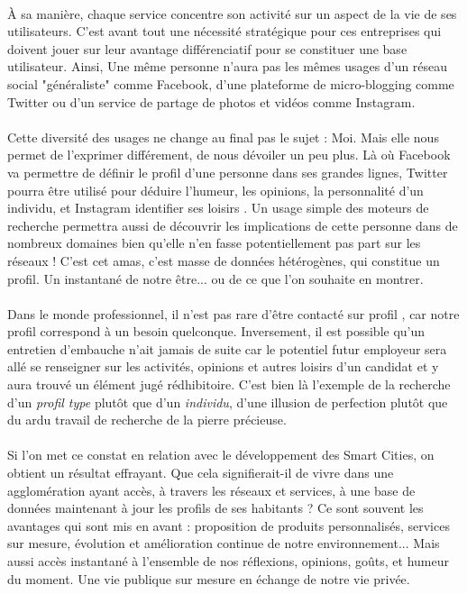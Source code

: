 \paragraph{} À sa manière, chaque service concentre son activité sur un aspect de la vie de ses utilisateurs. C'est avant 
tout une nécessité stratégique pour ces entreprises qui doivent jouer sur leur avantage différenciatif pour se constituer
une base utilisateur. Ainsi, Une même personne n'aura pas les mêmes usages d'un réseau social "généraliste" comme Facebook, 
d'une plateforme de micro-blogging comme Twitter ou d'un service de partage de photos et vidéos comme Instagram.

\paragraph{} Cette diversité des usages ne change au final pas le sujet : Moi. Mais elle nous permet de l'exprimer différement, 
de nous dévoiler un peu plus. Là où Facebook va permettre de définir le profil d'une personne dans ses grandes lignes, 
Twitter pourra être utilisé pour déduire l'humeur, les opinions, la personnalité d'un individu, et Instagram identifier
ses loisirs \cite{SocialMedia4}. Un usage simple des moteurs de recherche permettra aussi de découvrir les implications
de cette personne dans de nombreux domaines bien qu'elle n'en fasse potentiellement pas part sur les réseaux ! C'est cet 
amas, c'est masse de données hétérogènes, qui constitue un profil. Un instantané de notre être... ou de ce que l'on souhaite
en montrer.

\paragraph{} Dans le monde professionnel, il n'est pas rare d'être contacté \guillemotleft sur profil \guillemotright,
car \guillemotleft notre profil correspond \guillemotright à un besoin quelconque. Inversement, il est possible qu'un
entretien d'embauche n'ait jamais de suite car le potentiel futur employeur sera allé se renseigner sur les activités, 
opinions et autres loisirs d'un candidat et y aura trouvé un élément jugé rédhibitoire. C'est bien là l'exemple de la 
recherche d'un \emph{profil type} plutôt que d'un \emph{individu}, d'une illusion de perfection plutôt que du ardu travail
de recherche de la pierre précieuse.

\paragraph{} Si l'on met ce constat en relation avec le développement des Smart Cities, on obtient un résultat
effrayant. Que cela signifierait-il de vivre dans une agglomération ayant accès, à travers les réseaux et services, à une
base de données maintenant à jour les profils de ses habitants ? Ce sont souvent les avantages qui sont mis en avant : 
proposition de produits personnalisés, services sur mesure, évolution et amélioration continue de notre environnement...
Mais aussi accès instantané à l'ensemble de nos réflexions, opinions, goûts, et humeur du moment. Une vie publique sur 
mesure en échange de notre vie privée.

